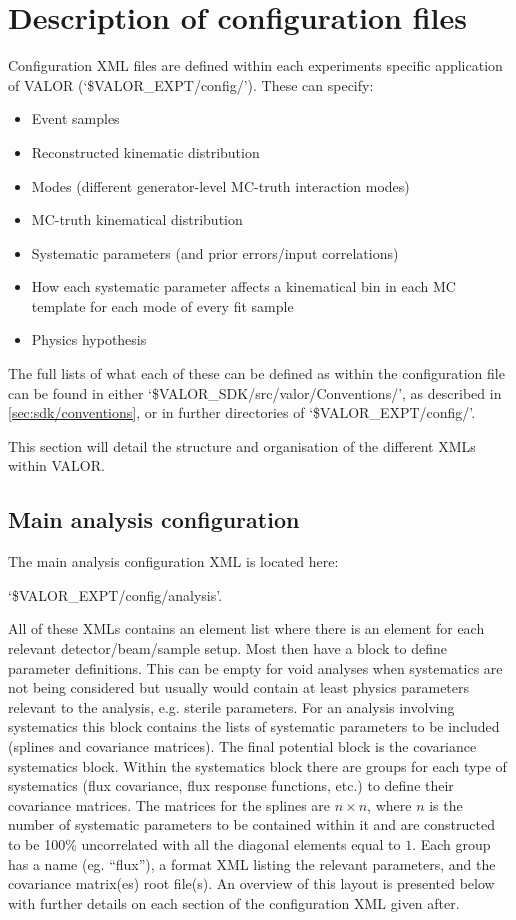 
\section{Description of configuration files}

Configuration XML files are defined within each experiments specific application of VALOR (`\$VALOR\_EXPT/config/'). These can specify:
\begin{itemize}
    \item Event samples
    \item Reconstructed kinematic distribution
    \item Modes (different generator-level MC-truth interaction modes)
    \item MC-truth kinematical distribution
    \item Systematic parameters (and prior errors/input correlations)
    \item How each systematic parameter affects a kinematical bin in each MC template for each mode of every fit sample
    \item Physics hypothesis
\end{itemize}

The full lists of what each of these can be defined as within the configuration file can be found in either `\$VALOR\_SDK/src/valor/Conventions/', as described in \ref{sec:sdk/conventions}, or in further directories of `\$VALOR\_EXPT/config/'.

This section will detail the structure and organisation of the different XMLs within VALOR.


\subsection{Main analysis configuration}

The main analysis configuration XML is located here:
\begin{center}
`\$VALOR\_EXPT/config/analysis'.     
\end{center}
All of these XMLs contains an element list where there is an element for each relevant detector/beam/sample setup. Most then have a block to define parameter definitions. This can be empty for void analyses when systematics are not being considered but usually would contain at least physics parameters relevant to the analysis, e.g. sterile parameters. For an analysis involving systematics this block contains the lists of systematic parameters to be included (splines and covariance matrices). The final potential block is the covariance systematics block. Within the systematics block there are groups for each type of systematics (flux covariance, flux response functions, etc.) to define their covariance matrices. The matrices for the splines are $n \times n$, where $n$ is the number of systematic parameters to be contained within it and are constructed to be 100\% uncorrelated with all the diagonal elements equal to $1$. Each group has a name (eg. ``flux''), a format XML listing the relevant parameters, and the covariance matrix(es) root file(s). An overview of this layout is presented below with further details on each section of the configuration XML given after.


